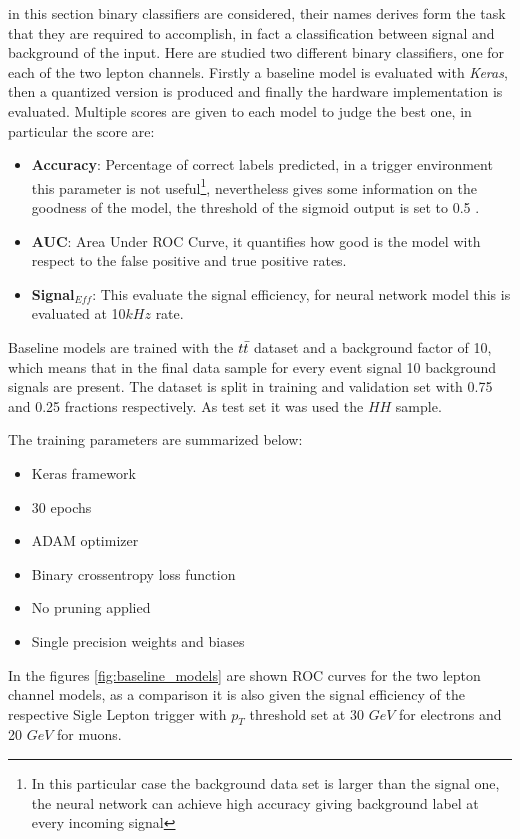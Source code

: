 \documentclass[../../main.tex]{subfiles}
\begin{document}
in this section binary classifiers are considered, their names derives form the task that they are required to accomplish, in fact a classification between signal and background of the input. Here are studied two different binary classifiers, one for each of the two lepton channels. Firstly a baseline model is evaluated with \textit{Keras}, then a quantized version is produced and finally the hardware implementation is evaluated.  
Multiple scores are given to each model to judge the best one, in particular the score are:
\begin{itemize}
    \item \textbf{Accuracy}: Percentage of correct labels predicted, in a trigger environment this parameter is not useful\footnote{In this particular case the background data set is larger than the signal one, the neural network can achieve high accuracy giving background label at every incoming signal}, nevertheless gives some information on the goodness of the model, the threshold of the sigmoid output is set to 0.5 .
    \item \textbf{AUC}: Area Under ROC Curve, it quantifies how good is the model with respect to the false positive and true positive rates.
    \item \textbf{Signal$_{Eff}$}: This evaluate the signal efficiency, for neural network model this is evaluated at 10$kHz$ rate.
\end{itemize}  

Baseline models are trained with the $t \Bar{t}$ dataset and a background factor of 10, which means that in the final data sample for every event signal 10 background signals are present. The dataset is split in training and validation set with 0.75 and 0.25 fractions respectively. As test set it was used the $HH$ sample.  

The training parameters are summarized below:
\begin{itemize}
    \item Keras framework
    \item 30 epochs
    \item ADAM optimizer
    \item Binary crossentropy loss function
    \item No pruning applied
    \item Single precision weights and biases
\end{itemize}

In the figures \ref{fig:baseline_models} are shown ROC curves for the two lepton channel models, as a comparison it is also given the signal efficiency of the respective Sigle Lepton trigger with $p_T$ threshold set at 30 $GeV$ for electrons and 20 $GeV$ for muons\cite{L1T-2up}.  
\end{document}
